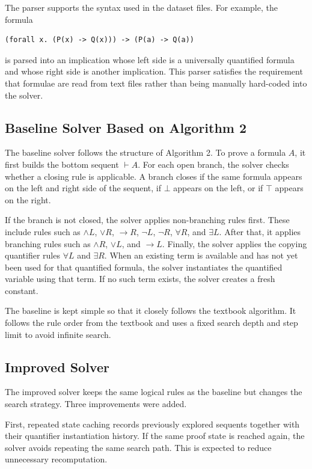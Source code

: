 \documentclass[runningheads]{llncs}
\begin{document}
The parser supports the syntax used in the dataset files. For example, the formula
\begin{verbatim}
(forall x. (P(x) -> Q(x))) -> (P(a) -> Q(a))
\end{verbatim}
is parsed into an implication whose left side is a universally quantified formula and whose right side is another implication. This parser satisfies the requirement that formulae are read from text files rather than being manually hard-coded into the solver.

\subsection{Baseline Solver Based on Algorithm 2}

The baseline solver follows the structure of Algorithm 2. To prove a formula $A$, it first builds the bottom sequent $\vdash A$. For each open branch, the solver checks whether a closing rule is applicable. A branch closes if the same formula appears on the left and right side of the sequent, if $\bot$ appears on the left, or if $\top$ appears on the right.

If the branch is not closed, the solver applies non-branching rules first. These include rules such as $\land L$, $\lor R$, $\rightarrow R$, $\neg L$, $\neg R$, $\forall R$, and $\exists L$. After that, it applies branching rules such as $\land R$, $\lor L$, and $\rightarrow L$. Finally, the solver applies the copying quantifier rules $\forall L$ and $\exists R$. When an existing term is available and has not yet been used for that quantified formula, the solver instantiates the quantified variable using that term. If no such term exists, the solver creates a fresh constant.

The baseline is kept simple so that it closely follows the textbook algorithm. It follows the rule order from the textbook and uses a fixed search depth and step limit to avoid infinite search.

\subsection{Improved Solver}

The improved solver keeps the same logical rules as the baseline but changes the search strategy. Three improvements were added.

First, repeated state caching records previously explored sequents together with their quantifier \textbf{}instantiation history. If the same proof state is reached again, the solver avoids repeating the same search path. This is expected to reduce unnecessary recomputation.
\end{document}
